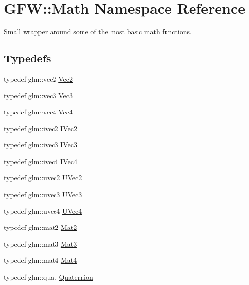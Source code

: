 \hypertarget{namespace_g_f_w_1_1_math}{}\section{G\+FW\+:\+:Math Namespace Reference}
\label{namespace_g_f_w_1_1_math}


Small wrapper around some of the most basic math functions.  


\subsection*{Typedefs}
\begin{DoxyCompactItemize}
\item 
typedef glm\+::vec2 \hyperlink{namespace_g_f_w_1_1_math_af5ba989006b289f1e575dd7a911c1521}{Vec2}
\item 
typedef glm\+::vec3 \hyperlink{namespace_g_f_w_1_1_math_a3c3a254de27c8bbb8434611ce231c378}{Vec3}
\item 
typedef glm\+::vec4 \hyperlink{namespace_g_f_w_1_1_math_a22b76a9624ba36b0f4eaa46d2e6b1fae}{Vec4}
\item 
typedef glm\+::ivec2 \hyperlink{namespace_g_f_w_1_1_math_ab6d2f3e9b7437b6947f3bc18f723ffb4}{I\+Vec2}
\item 
typedef glm\+::ivec3 \hyperlink{namespace_g_f_w_1_1_math_aaf8f1459d5e42f6e52f8af0dbf2888ab}{I\+Vec3}
\item 
typedef glm\+::ivec4 \hyperlink{namespace_g_f_w_1_1_math_a710b3588a23f538485a8760e9e109b96}{I\+Vec4}
\item 
typedef glm\+::uvec2 \hyperlink{namespace_g_f_w_1_1_math_a804f4544e7f9f1d56cf67b5669922699}{U\+Vec2}
\item 
typedef glm\+::uvec3 \hyperlink{namespace_g_f_w_1_1_math_a40d5d182d7672b00d21719f80bf917fa}{U\+Vec3}
\item 
typedef glm\+::uvec4 \hyperlink{namespace_g_f_w_1_1_math_a030ce1aafa261033255bc45d378322ea}{U\+Vec4}
\item 
typedef glm\+::mat2 \hyperlink{namespace_g_f_w_1_1_math_a84c8cb525c3c8be2c572eaf2839d76a2}{Mat2}
\item 
typedef glm\+::mat3 \hyperlink{namespace_g_f_w_1_1_math_ab5dfc77d541d85c8e2a42f6e645fba70}{Mat3}
\item 
typedef glm\+::mat4 \hyperlink{namespace_g_f_w_1_1_math_a313d630ab7d0ef3b109bb39401962fb1}{Mat4}
\item 
typedef glm\+::quat \hyperlink{namespace_g_f_w_1_1_math_ae0c2a9f7efcd94286b950a2ddea66ee0}{Quaternion}
\end{DoxyCompactItemize}
